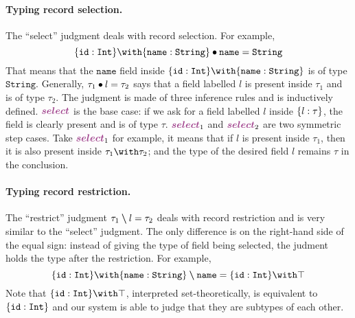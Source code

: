 \paragraph{Typing record selection.}
The ``select'' judgment deals with record selection. For example,
\[
\judgeSelect {\recordType {\texttt{id}} \Int \andOp \recordType {\texttt{name}} \String}
{\texttt{name}} {\String}
\]
That means that the $\texttt{name}$ field inside
$\recordType {\texttt{id}} \Int \andOp \recordType {\texttt{name}} \String$ is of type
$\texttt{String}$. Generally, $\tau_1 \bullet l = \tau_2$ says that a field
labelled $l$ is present inside $\tau_1$ and is of type $\tau_2$. The judgment is
made of three inference rules and is inductively defined. $\ruleLabelSelect$ is
the base case: if we ask for a field labelled $l$ inside $\{ l : \tau \}$, the
field is clearly present and is of type $\tau$. $\ruleLabelSelectLeft$ and
$\ruleLabelSelectRight$ are two symmetric step cases. Take
$\ruleLabelSelectLeft$ for example, it means that if $l$ is present inside
$\tau_1$, then it is also present inside $\tau_1 \andOp \tau_2$; and the type of
the desired field $l$ remains $\tau$ in the conclusion.

\paragraph{Typing record restriction.}
The ``restrict'' judgment $\tau_1 \bm{\setminus} l = \tau_2$ deals with record
restriction and is very similar to the ``select'' judgment. The only difference
is on the right-hand side of the equal sign: instead of giving the type of field being selected, the judment holds
the type after the restriction. For example,
\[
\judgeRestrict {\recordType {\code{id}} \Int \andOp \recordType {\code{name}} \String}
{\code{name}} {\recordType {\code{id}} \Int \andOp \top}
\]
Note that $\recordType {\code{id}} \Int \andOp \top$, interpreted set-theoretically,
is equivalent to $\{ \texttt {id} : \texttt {Int} \}$ and our system is able to judge
that they are subtypes of each other.


